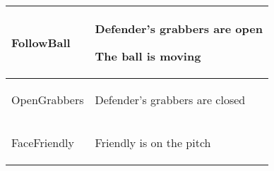 \begin{center}
\begin{tabular}{ | l | p{110mm} | }
FollowBall &
\begin{compactitem}
\item Defender's grabbers are open
\item The ball is moving
\end{compactitem}  \\ \hline

OpenGrabbers &
\begin{compactitem}
\item Defender's grabbers are closed
\end{compactitem}  \\ \hline

FaceFriendly &
\begin{compactitem}
\item Friendly is on the pitch
\end{compactitem}  \\ \hline
\end{tabular}
\par
\bigskip

\end{center}
